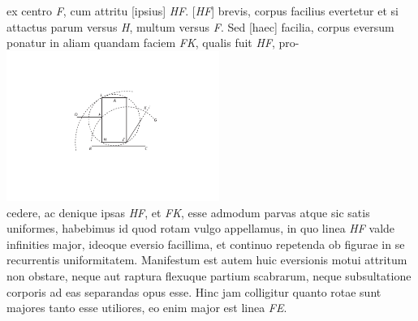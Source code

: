  ex centro \textit{F}, cum attritu\protect{} [ipsius] \textit{HF}.  [\textit{HF}] brevis, corpus facilius evertetur et si attactus parum versus \textit{H}, multum versus \textit{F}. Sed [haec] facilia, corpus eversum ponatur in aliam quandam faciem \textit{FK}, qualis fuit \textit{HF}, pro-
\pend
\newpage
\pstart
\centering
\includegraphics[trim = 0mm -2mm 0mm 0mm, clip, width=0.52\textwidth]{images/lh03705_008-d3.pdf}\\
\noindent {} 
\pend
\vspace{1.5em}
\pstart \noindent cedere, ac denique ipsas \textit{HF}, et \textit{FK}, esse admodum parvas atque sic satis uniformes, habebimus id quod rotam vulgo appellamus, in quo linea \textit{HF} valde  infinities major, ideoque eversio facillima, et continuo repetenda ob figurae in se recurrentis uniformitatem. Manifestum est autem huic eversionis motui attritum\protect{} non obstare, neque aut raptura flexuque partium scabrarum, neque subsultatione corporis ad eas separandas opus esse. Hinc jam colligitur quanto rotae sunt majores tanto esse utiliores, eo enim major est linea \textit{FE}.
